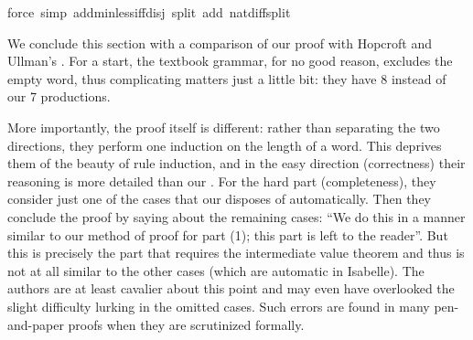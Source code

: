 \begin{isabellebody}
force\ simp\ add{\isacharcolon}min{\isacharunderscore}less{\isacharunderscore}iff{\isacharunderscore}disj\ split\ add{\isacharcolon}\ nat{\isacharunderscore}diff{\isacharunderscore}split{\isacharparenright}%
\begin{isamarkuptext}%
We conclude this section with a comparison of our proof with 
Hopcroft and Ullman's
\cite[p.]{HopcroftUllman}.
For a start, the textbook
grammar, for no good reason, excludes the empty word, thus complicating
matters just a little bit: they have 8 instead of our 7 productions.

More importantly, the proof itself is different: rather than
separating the two directions, they perform one induction on the
length of a word. This deprives them of the beauty of rule induction,
and in the easy direction (correctness) their reasoning is more
detailed than our . For the hard part (completeness), they
consider just one of the cases that our  disposes of
automatically. Then they conclude the proof by saying about the
remaining cases: ``We do this in a manner similar to our method of
proof for part (1); this part is left to the reader''. But this is
precisely the part that requires the intermediate value theorem and
thus is not at all similar to the other cases (which are automatic in
Isabelle). The authors are at least cavalier about this point and may
even have overlooked the slight difficulty lurking in the omitted
cases.  Such errors are found in many pen-and-paper proofs when they
are scrutinized formally.%
%
\end{isamarkuptext}%
\end{isabellebody}%
